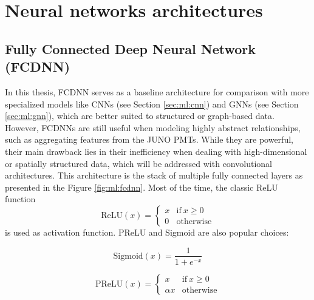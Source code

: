 \documentclass[../main.tex]{subfiles}
\begin{document}
\section{Neural networks architectures}
\label{sec:ml:architecture}

\subsection{Fully Connected Deep Neural Network (FCDNN)}
\label{sec:ml:fcdnn}

In this thesis, FCDNN serves as a baseline architecture for comparison with more specialized models like CNNs (see Section \ref{sec:ml:cnn}) and GNNs (see Section \ref{sec:ml:gnn}), which are better suited to structured or graph-based data. However, FCDNNs are still useful when modeling highly abstract relationships, such as aggregating features from the JUNO PMTs. While they are powerful, their main drawback lies in their inefficiency when dealing with high-dimensional or spatially structured data, which will be addressed with convolutional architectures.
This architecture is the stack of multiple fully connected layers as presented in the Figure \ref{fig:ml:fcdnn}. Most of the time, the classic ReLU function
\begin{equation}
  \label{eq:ml:relu}
  \mathrm{ReLU}(x) = \begin{cases}
    x & \mathrm{if} ~ x \geq 0 \\
    0 & \mathrm{otherwise}
  \end{cases}
\end{equation}
is used as activation function. PReLU and Sigmoid are also popular choices:


\begin{minipage}{0.5\linewidth}
  \begin{equation}
    \label{sec:ml:sigmoid}
    \mathrm{Sigmoid}(x) = \frac{1}{1+ e^{-x}}
  \end{equation}
\end{minipage}
\begin{minipage}{0.5\linewidth}
  \begin{equation}
    \label{sec:ml:prelu}
    \mathrm{PReLU}(x) = \begin{cases}
      x & \mathrm{if} ~ x \geq 0 \\
      \alpha x & \mathrm{otherwise}
    \end{cases}
  \end{equation}
\end{minipage}
\end{document}
